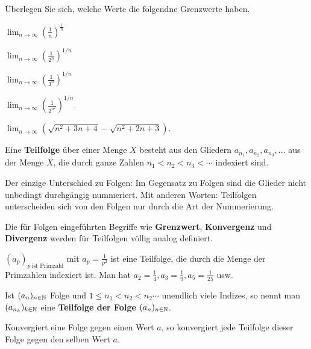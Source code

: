 \begin{aufg}
	Überlegen Sie sich, welche Werte die folgendne Grenzwerte haben. 
	\begin{enuma}
			\item $\lim_{n \to \infty} (\frac{1}{n})^{\frac{1}{n}}$
			\item $\lim_{n \to \infty} ( \frac{1}{2^n})^{1/n} $
			\item $\lim_{n \to \infty} ( \frac{1}{3^n})^{1/n} $
			\item $\lim_{n \to \infty} (\frac{1}{2^{n^2}})^{1/n}$. 
			\item $\lim_{n \to \infty} (\sqrt{n^2 + 3n +4} - \sqrt{n^2 + 2n + 3})$. 
	\end{enuma} 
\end{aufg} 



\begin{defn} 
	Eine \textbf{Teilfolge} über einer Menge $X$ besteht aus den Gliedern $a_{n_1} , a_{n_2}, a_{n_3},\ldots$ aus der Menge $X$, die durch ganze Zahlen $n_1 < n_2 < n_3 <  \cdots$ indexiert sind. 
	
	Der einzige Unterschied zu Folgen: Im Gegensatz zu Folgen sind die Glieder nicht unbedingt durchgängig nummeriert. Mit anderen Worten: Teilfolgen unterscheiden sich von den Folgen nur durch die Art der Nummerierung. 
	
	Die für Folgen eingeführten Begriffe wie \textbf{Grenzwert}, \textbf{Konvergenz} und \textbf{Divergenz} werden für Teilfolgen völlig analog definiert. 
\end{defn} 

\begin{bsp}
	$(a_p)_{p \ \text{ist Primzahl}}$ mit $a_p = \frac{1}{p^2}$ ist eine Teilfolge, die durch die Menge der Primzahlen indexiert ist. Man hat $a_2 = \frac{1}{4}, a_3 = \frac{1}{9}, a_5 = \frac{1}{25}$ usw. 
\end{bsp} 

\begin{defn} 
	Ist $(a_n)_{n \in \mathbb{N}}$ Folge und $1 \le n_1 < n_2 < n_2 \cdots $ unendlich viele Indizes, so nennt man $(a_{n_k})_{k \in \mathbb{N}}$ eine \textbf{Teilfolge der Folge} $(a_n)_{n \in \mathbb{N}}$. 
\end{defn} 


\begin{thm}
	Konvergiert eine Folge gegen einen Wert $a$, so konvergiert jede Teilfolge dieser Folge gegen den selben Wert $a$. 
\end{thm} 

